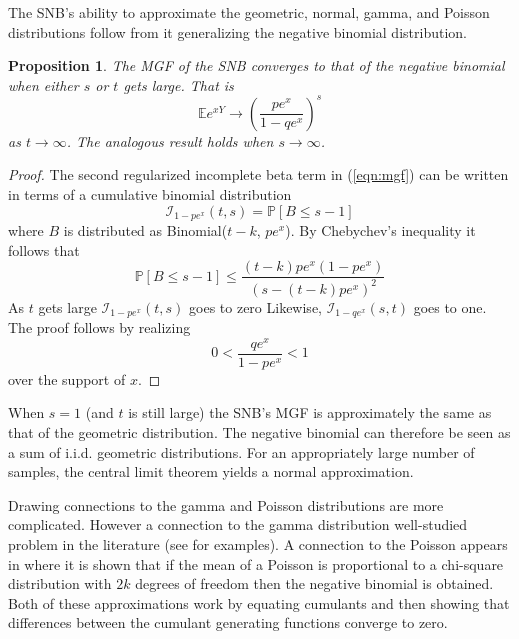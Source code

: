 \documentclass[review]{elsarticle}
\newtheorem{prop}{Proposition}
\begin{document}
The SNB's ability to approximate the geometric, normal, gamma, and Poisson
distributions follow from it generalizing the negative binomial distribution. 
\begin{prop}
The MGF of the SNB converges to that of the negative binomial when either
$s$ or $t$ gets large. That is
\begin{equation*}
\mathbb{E} e^{xY} \rightarrow \left( \frac{pe^x}{1-qe^x} \right)^s
\end{equation*}
as $t \rightarrow \infty$. The analogous result holds when 
$s \rightarrow \infty$.
\end{prop}
\begin{proof}
The second regularized incomplete beta term in (\ref{eqn:mgf}) can be written
in terms of a cumulative binomial distribution
\begin{equation*}
\mathcal{I}_{1-pe^x}(t, s) = \mathbb{P}\left[ B \leq s-1 \right]
\end{equation*}
where $B$ is distributed as
Binomial($t-k$, $pe^x$). By Chebychev's inequality %
it follows that
\begin{equation} \label{eqn:hoeffding}
\mathbb{P}\left[ B \leq s-1 \right] \leq 
  \frac{ (t-k) pe^x (1-pe^x) }{ \left(s - (t-k)pe^x\right)^2 }
\end{equation}
As $t$ gets large $\mathcal{I}_{1-pe^x}(t, s)$ goes to zero
Likewise, $\mathcal{I}_{1-qe^x}(s, t)$ goes
to one. The proof follows by realizing 
\begin{equation*}
0 < \frac{qe^x}{1-pe^x} < 1
\end{equation*}
over the support of $x$.
\end{proof}

When $s=1$ (and $t$ is still large) the SNB's MGF is approximately 
the same as that of the
geometric distribution. The negative
binomial can therefore be seen as a sum of i.i.d. geometric distributions.
For an appropriately large number of samples, the central limit theorem
yields a normal approximation.

Drawing connections to the gamma and Poisson distributions are more complicated.
However a connection to the gamma distribution well-studied problem in the 
literature (see \cite{Ord1968,Guenther1972,Best1974} for examples). 
A connection to the Poisson appears in \cite{Anscombe1950} where
it is shown that if the mean of a Poisson is proportional
to a chi-square distribution with $2k$ degrees of freedom
then the negative binomial is obtained. 
Both of these approximations work by equating cumulants and then showing 
that differences between the cumulant generating
functions converge to zero.
\end{document}
